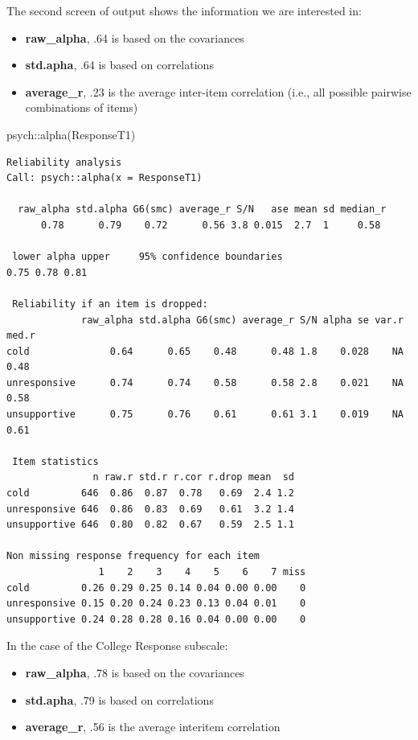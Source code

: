 \documentclass[
  english,
]{book}
\newenvironment{Shaded}{\begin{snugshade}}{\end{snugshade}}
\newcommand{\FunctionTok}[1]{\textcolor[rgb]{0.00,0.00,0.00}{#1}}
\newcommand{\NormalTok}[1]{#1}
\newcommand{\SpecialCharTok}[1]{\textcolor[rgb]{0.00,0.00,0.00}{#1}}
\providecommand{\tightlist}{%
  \setlength{\itemsep}{0pt}\setlength{\parskip}{0pt}}
\begin{document}
The second screen of output shows the information we are interested in:

\begin{itemize}
\tightlist
\item
  \textbf{raw\_alpha}, .64 is based on the covariances
\item
  \textbf{std.apha}, .64 is based on correlations
\item
  \textbf{average\_r}, .23 is the average inter-item correlation (i.e., all possible pairwise combinations of items)
\end{itemize}

\begin{Shaded}
\begin{Highlighting}[]
\NormalTok{psych}\SpecialCharTok{::}\FunctionTok{alpha}\NormalTok{(ResponseT1)}
\end{Highlighting}
\end{Shaded}

\begin{verbatim}
Reliability analysis   
Call: psych::alpha(x = ResponseT1)

  raw_alpha std.alpha G6(smc) average_r S/N   ase mean sd median_r
      0.78      0.79    0.72      0.56 3.8 0.015  2.7  1     0.58

 lower alpha upper     95% confidence boundaries
0.75 0.78 0.81 

 Reliability if an item is dropped:
             raw_alpha std.alpha G6(smc) average_r S/N alpha se var.r med.r
cold              0.64      0.65    0.48      0.48 1.8    0.028    NA  0.48
unresponsive      0.74      0.74    0.58      0.58 2.8    0.021    NA  0.58
unsupportive      0.75      0.76    0.61      0.61 3.1    0.019    NA  0.61

 Item statistics 
               n raw.r std.r r.cor r.drop mean  sd
cold         646  0.86  0.87  0.78   0.69  2.4 1.2
unresponsive 646  0.86  0.83  0.69   0.61  3.2 1.4
unsupportive 646  0.80  0.82  0.67   0.59  2.5 1.1

Non missing response frequency for each item
                1    2    3    4    5    6    7 miss
cold         0.26 0.29 0.25 0.14 0.04 0.00 0.00    0
unresponsive 0.15 0.20 0.24 0.23 0.13 0.04 0.01    0
unsupportive 0.24 0.28 0.28 0.16 0.04 0.00 0.00    0
\end{verbatim}

In the case of the College Response subscale:

\begin{itemize}
\tightlist
\item
  \textbf{raw\_alpha}, .78 is based on the covariances
\item
  \textbf{std.apha}, .79 is based on correlations
\item
  \textbf{average\_r}, .56 is the average interitem correlation
\end{itemize}
\end{document}
